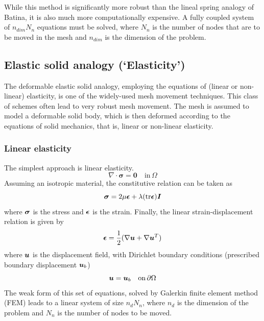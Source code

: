  While this method is significantly more robust than the lineal spring analogy of Batina, it is also much more computationally expensive. A fully coupled system of $n_{dim} N_n$ equations must be solved, where $N_n$ is the number of nodes that are to be moved in the mesh and $n_{dim}$ is the dimension of the problem.
 
 \subsection{Elastic solid analogy (`Elasticity')}
 
 The deformable elastic solid analogy, employing the equations of (linear or non-linear) elasticity, is one of the widely-used mesh movement techniques. This class of schemes often lead to very robust mesh movement. The mesh is assumed to model a deformable solid body, which is then deformed according to the equations of solid mechanics, that is, linear or non-linear elasticity.
 
 \subsubsection{Linear elasticity}
 
 The simplest approach is linear elasticity.
 \begin{equation}
 \nabla \cdot \mathbf{\sigma}  = \mathbf{0} \quad \text{in} \, \Omega
 \end{equation}
 Assuming an isotropic material, the constitutive relation can be taken as
 \begin{equation}
 \boldsymbol{\sigma} = 2\mu\boldsymbol{\epsilon} + \lambda (\mathrm{tr}\boldsymbol{\epsilon}) \boldsymbol{I}
 \label{linelast:constt}
 \end{equation}
 where $\boldsymbol{\sigma}$ is the stress and $\boldsymbol{\epsilon}$ is the strain.
 Finally, the linear strain-displacement relation is given by
 \begin{equation}
 \boldsymbol{\epsilon} = \frac12 (\nabla\boldsymbol{u}+\nabla\boldsymbol{u}^T)
 \label{linelast:strain}
 \end{equation}
 where $\boldsymbol{u}$ is the displacement field, with Dirichlet boundary conditions (prescribed boundary displacement $\boldsymbol{u}_b$)
 \begin{equation}
 \boldsymbol{u} = \boldsymbol{u}_b \quad \text{on} \, \partial\Omega
 \end{equation}
 The weak form of this set of equations, solved by Galerkin finite element method (FEM) leads to a linear system of size $n_d N_n$, where $n_d$ is the dimension of the problem and $N_n$ is the number of nodes to be moved.
 
